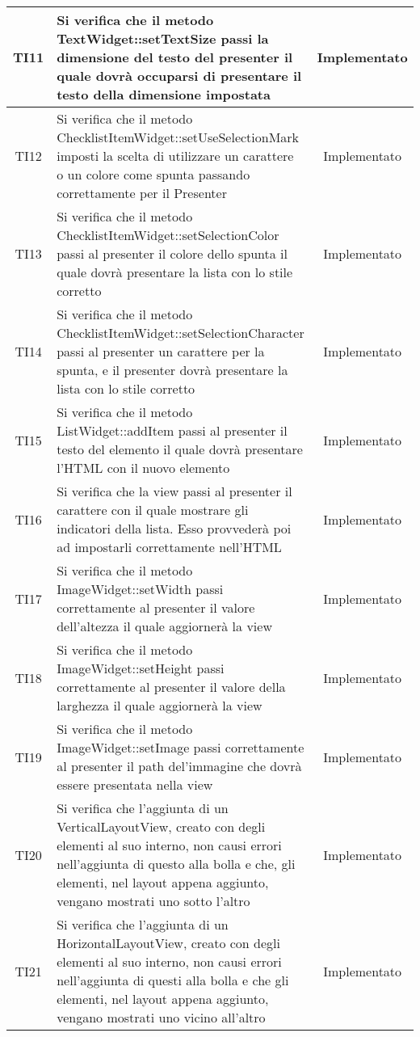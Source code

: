 \begin{center}
\begin{longtable}{|c|>{\centering}m{10cm}|c|}
		TI11 & Si verifica che il metodo TextWidget::setTextSize passi la dimensione del testo del presenter il quale dovrà occuparsi di presentare il testo della dimensione impostata & Implementato \\ \hline
		TI12 & Si verifica che il metodo ChecklistItemWidget::setUseSelectionMark imposti la scelta di utilizzare un carattere o un colore come spunta passando correttamente per il Presenter & Implementato \\ \hline
		TI13 & Si verifica che il metodo ChecklistItemWidget::setSelectionColor passi al presenter il colore dello spunta il quale dovrà presentare la lista con lo stile corretto & Implementato \\ \hline
		TI14 & Si verifica che il metodo ChecklistItemWidget::setSelectionCharacter passi al presenter un carattere per la spunta, e il presenter dovrà presentare la lista con lo stile corretto & Implementato \\ \hline
		TI15 & Si verifica che il metodo ListWidget::addItem passi al presenter il testo del elemento il quale dovrà presentare l'HTML con il nuovo elemento & Implementato \\ \hline
		TI16 & Si verifica che la view passi al presenter il carattere con il quale mostrare gli indicatori della lista. Esso provvederà poi ad impostarli correttamente nell'HTML & Implementato \\ \hline
		TI17 & Si verifica che il metodo ImageWidget::setWidth passi correttamente al presenter il valore dell'altezza il quale aggiornerà la view & Implementato \\ \hline
		TI18 & Si verifica che il metodo ImageWidget::setHeight passi correttamente al presenter il valore della larghezza il quale aggiornerà la view & Implementato \\ \hline
		TI19 & Si verifica che il metodo ImageWidget::setImage passi correttamente al presenter il path del'immagine che dovrà essere presentata nella view & Implementato \\ \hline
		TI20 & Si verifica che l'aggiunta di un VerticalLayoutView, creato con degli elementi al suo interno, non causi errori nell'aggiunta di questo alla bolla e che, gli elementi, nel layout appena aggiunto, vengano mostrati uno sotto l'altro & Implementato \\ \hline
		TI21 & Si verifica che l'aggiunta di un HorizontalLayoutView, creato con degli elementi al suo interno, non causi errori nell'aggiunta di questi alla bolla e che gli elementi, nel layout appena aggiunto, vengano mostrati uno vicino all'altro & Implementato \\ \hline

\end{longtable}
\end{center}

